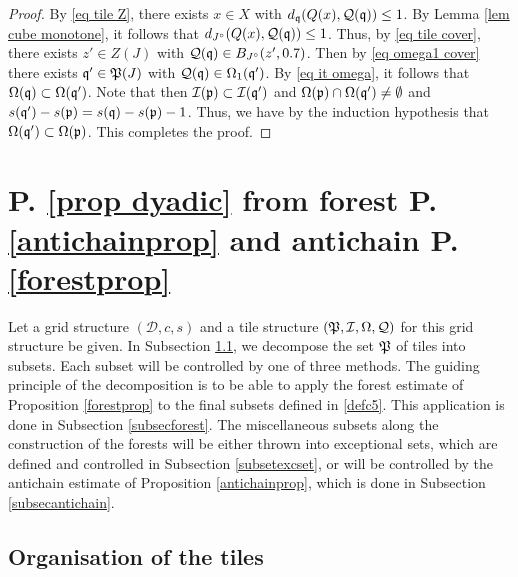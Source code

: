 \begin{proof}
    By \eqref{eq tile Z}, there exists $x \in X$ with $d_{\mathfrak q}(Q(x), \mathcal{Q}(\mathfrak q)) \le 1$. By Lemma \ref{lem cube monotone}, it follows that $d_{J^\circ}(Q(x), \mathcal{Q}(\mathfrak q)) \le 1$.
    Thus, by \eqref{eq tile cover}, there exists $z' \in Z(J)$ with $\mathcal{Q}(\mathfrak q) \in B_{J^\circ}(z', 0.7)$. Then by \eqref{eq omega1 cover} there exists $\mathfrak q' \in \mathfrak P(J)$ with $\mathcal{Q}(\mathfrak q) \in\Omega_1(\mathfrak q')$.
    By \eqref{eq it omega}, it follows that $\Omega(\mathfrak q) \subset \Omega(\mathfrak q')$. Note that then $\mathcal{I}(\mathfrak p) \subset \mathcal{I}(\mathfrak q')$ and $\Omega(\mathfrak p) \cap \Omega(\mathfrak q') \ne \emptyset$ and $s(\mathfrak q') - s(\mathfrak p) = s(\mathfrak q) - s(\mathfrak p) - 1$. Thus, we have by the induction hypothesis that $\Omega(\mathfrak q') \subset \Omega(\mathfrak p)$. This completes the proof.
\end{proof}

\chapter{P. \ref{prop dyadic} from forest P. \ref{antichainprop} and antichain P. \ref{forestprop}}
\label{proptopropprop}



Let a grid structure $(\mathcal{D}, c, s)$  and a tile structure $(\mathfrak P,\mathcal{I},\Omega,\mathcal{Q})$
for this grid structure be given.
In Subsection \ref{subsectilesorg}, we decompose the
set $\mathfrak P$ of tiles into subsets.
Each subset will be controlled by one of three methods.
The guiding principle of the decomposition is
to be able to apply the forest estimate
of Proposition \ref{forestprop} to the final subsets
defined in \eqref{defc5}. This application is done in Subsection \ref{subsecforest}.
The miscellaneous subsets along the construction of the
forests will be either thrown into exceptional sets,
which are defined and controlled in Subsection
\ref{subsetexcset}, or will be controlled by
the antichain estimate of Proposition \ref{antichainprop},
which is done in Subsection \ref{subsecantichain}.




\section{Organisation of the tiles}\label{subsectilesorg}

